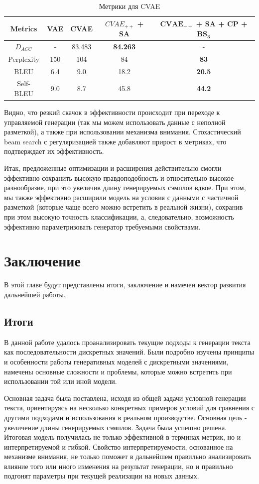 \documentclass{spbau-diploma}
\begin{document}
\begin{table}
\begin{tabular}{c | c c c c}
\toprule
Metrics & VAE & CVAE & $CVAE_{++}$ + SA & \textbf{$\boldsymbol{CVAE_{++}}$ + SA + CP + $\boldsymbol{BS_3}$} \\
\midrule
$D_{ACC}$ & - & 83.483 & \textbf{84.263} & - \\
Perplexity & 150 & 104 & 84 & \textbf{83} \\
BLEU & 6.4 & 9.0 & 18.2 & \textbf{20.5} \\
Self-BLEU & 9.0 & 8.7 & 45.8 & \textbf{44.2} \\
\bottomrule
\end{tabular}
\caption{Метрики для CVAE}
\label{cvae_table}
\end{table}

Видно, что резкий скачок в эффективности происходит при переходе к управляемой
генерации (так мы можем использовать данные с неполной разметкой), а также при
использовании механизма внимания. Стохастический beam search с регуляризацией
также добавляют прирост в метриках, что подтверждает их эффективность. 

Итак, предложенные оптимизации и расширения действительно смогли эффективно 
сохранить высокую правдоподобность и относительно высокое разнообразие, при 
это увеличив длину генерируемых сэмплов вдвое. При этом, мы также эффективно 
расширили модель на условия с данными с частичной разметкой (которые чаще 
всего можно встретить в реальной жизни), сохранив при этом высокую точность 
классификации, а, следовательно, возможность эффективно параметризовать 
генератор требуемыми свойствами.

\section{Заключение}
В этой главе будут представлены итоги, заключение и намечен вектор развития 
дальнейшей работы.

\subsection{Итоги}
В данной работе удалось проанализировать текущие подходы к генерации текста как
последовательности дискретных значений. Были подробно изучены принципы и 
особенности работы генеративных моделей с дискретными значениями, намечены 
основные сложности и проблемы, которые можно встретить при использовании той 
или иной модели.

Основная задача была поставлена, исходя из общей задачи условной генерации 
текста, ориентируясь на несколько конкретных примеров условий для сравнения с
другими подходами и использования в реальном производстве. Основная цель - 
увеличение длины генерируемых сэмплов. Задача была успешно решена. Итоговая 
модель получилась не только эффективной в терминах метрик, но и 
интерпретируемой и гибкой. Свойство интерпретируемости, основанное на 
механизме внимания, не только поможет в дальнейшем правильно анализировать 
влияние того или иного изменения на результат генерации, но и правильно 
подгонят параметры при текущей реализации на новых данных.
\end{document}
